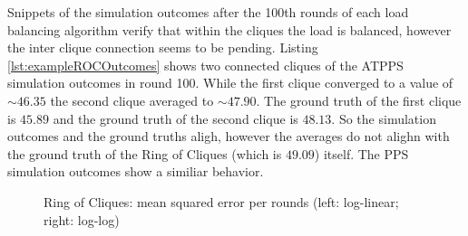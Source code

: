Snippets of the simulation outcomes after the 100th rounds of each load balancing algorithm verify that within the cliques the load is balanced, however the inter clique connection seems to be pending. Listing \ref{lst:exampleROCOutcomes} shows two connected cliques of the ATPPS simulation outcomes in round 100. While the first clique converged to a value of $\sim 46.35$ the second clique averaged to $\sim 47.90$. The ground truth of the first clique is $45.89$ and the ground truth of the second clique is $48.13$. So the simulation outcomes and the ground truths aligh, however the averages do not alighn with the ground truth of the Ring of Cliques (which is $49.09$) itself. The PPS simulation outcomes show a similiar behavior.
\begin{figure}[!ht]
    \centering
    \hfil
    \caption{Ring of Cliques: mean squared error per rounds (left: log-linear; right: log-log)}
        \label{fig:128x8RingOfCliquesLog_LogLog}
\end{figure}

